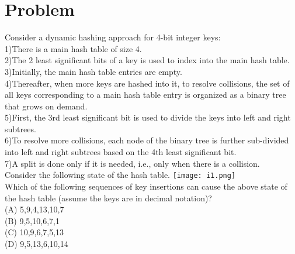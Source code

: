 \documentclass[journal,12pt,twocolumn]{IEEEtran}
\begin{document}
\section{Problem}
Consider a dynamic hashing approach for 4-bit integer keys:\\
1)There is a main hash table of size 4.\\
2)The 2 least significant bits of a key is used to index into the main hash table.\\
3)Initially, the main hash table entries are empty.\\
4)Thereafter, when more keys are hashed into it, to resolve collisions, the set of all keys corresponding to a main hash table entry is organized as a binary tree that grows on demand.\\
5)First, the 3rd least significant bit is used to divide the keys into left and right subtrees.\\
6)To resolve more collisions, each node of the binary tree is further sub-divided into left and right subtrees based on the 4th least significant bit.\\
7)A split is done only if it is needed, i.e., only when there is a collision.\\
Consider the following state of the hash table.
\texttt{[image: i1.png]}\\
Which of the following sequences of key insertions can cause the above state of the hash table (assume the keys are in decimal notation)?\\
(A) 5,9,4,13,10,7\\
(B) 9,5,10,6,7,1\\
(C) 10,9,6,7,5,13\\
(D) 9,5,13,6,10,14
\end{document}
